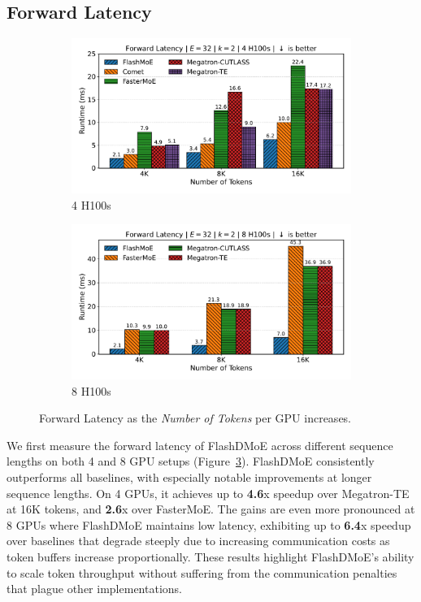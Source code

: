 \subsection{Forward Latency}\label{subsec:forward-latency}
\begin{figure}[!h]
    \centering
    \begin{subfigure}{0.49\textwidth}
        \centering
        \includegraphics[width=\linewidth, keepaspectratio]{flash_figs/scaling_tokens}
        \caption{4 H100s}
        \label{sub:4gl}
    \end{subfigure}
    \begin{subfigure}{0.49\textwidth}
        \centering
        \includegraphics[width=\linewidth, keepaspectratio]{flash_figs/scaling_tokens_8}
        \caption{8 H100s}
        \label{sub:8gl}
    \end{subfigure}
    \caption{Forward Latency as the \emph{Number of Tokens} per GPU increases.}
    \label{fig:fl}
\end{figure}
We first measure the forward latency of FlashDMoE across different sequence lengths on both 4 and 8 GPU setups
(Figure~\ref{fig:fl}).
FlashDMoE consistently outperforms all baselines,
with especially notable improvements at longer sequence lengths.
On 4 GPUs, it achieves up to \textbf{4.6}x speedup over Megatron-TE at 16K tokens,
and \textbf{2.6}x over FasterMoE.
The gains are even more pronounced at 8 GPUs
where FlashDMoE maintains low latency, exhibiting up to \textbf{6.4}x speedup over baselines that
degrade steeply due to increasing communication costs as token buffers increase proportionally.
These results highlight FlashDMoE’s ability to scale token throughput without suffering from the communication
penalties that plague other implementations.
